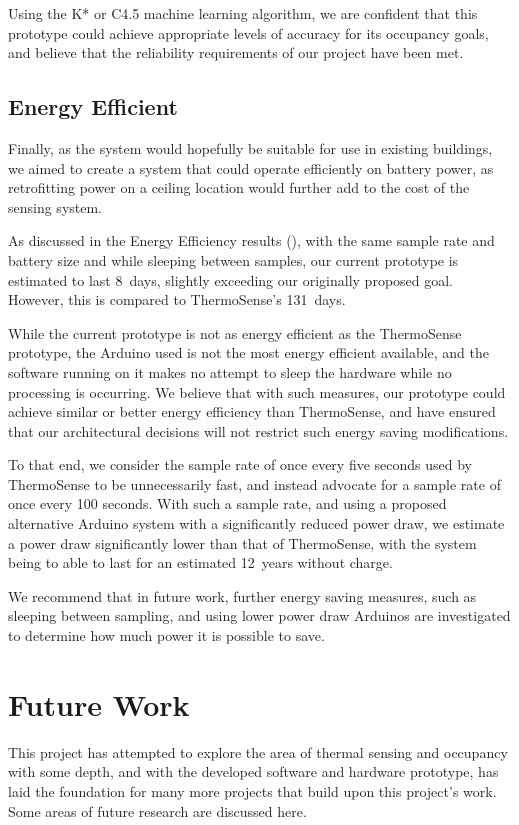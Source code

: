 \documentclass[../thesis/thesis.tex]{subfiles}
\begin{document}
Using the K* or C4.5 machine learning algorithm, we are confident that this prototype could achieve appropriate levels of accuracy for its occupancy goals, and believe that the reliability requirements of our project have been met.

\subsection{Energy Efficient}
Finally, as the system would hopefully be suitable for use in existing buildings, we aimed to create a system that could operate efficiently on battery power, as retrofitting power on a ceiling location would further add to the cost of the sensing system.

As discussed in the Energy Efficiency results (), with the same sample rate and battery size and while sleeping between samples, our current prototype is estimated to last 8~days, slightly exceeding our originally proposed goal. However, this is compared to ThermoSense's 131~days.

While the current prototype is not as energy efficient as the ThermoSense prototype, the Arduino used is not the most energy efficient available, and the software running on it makes no attempt to sleep the hardware while no processing is occurring. We believe that with such measures, our prototype could achieve similar or better energy efficiency than ThermoSense, and have ensured that our architectural decisions will not restrict such energy saving modifications.

To that end, we consider the sample rate of once every five seconds used by ThermoSense to be unnecessarily fast, and instead advocate for a sample rate of once every 100 seconds. With such a sample rate, and using a proposed alternative Arduino system with a significantly reduced power draw, we estimate a power draw significantly lower than that of ThermoSense, with the system being to able to last for an estimated 12~years without charge.

We recommend that in future work, further energy saving measures, such as sleeping between sampling, and using lower power draw Arduinos are investigated to determine how much power it is possible to save.

\section{Future Work}
This project has attempted to explore the area of thermal sensing and occupancy with some depth, and with the developed software and hardware prototype, has laid the foundation for many more projects that build upon this project's work. Some areas of future research are discussed here.
\end{document}
